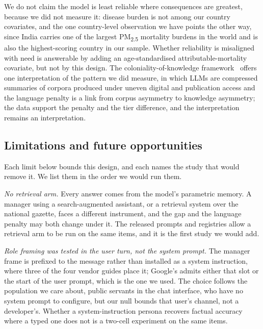 We do not claim the model is least reliable where consequences are greatest,
because we did not measure it: disease burden is not among our country
covariates, and the one country-level observation we have points the other way,
since India carries one of the largest PM\textsubscript{2.5} mortality burdens
in the world and is also the highest-scoring country in our sample. Whether
reliability is misaligned with need is answerable by adding an age-standardised
attributable-mortality covariate, but not by this design. The
coloniality-of-knowledge framework~\citep{mohamed2020decolonial} offers one
interpretation of the pattern we did measure, in which LLMs are compressed
summaries of corpora produced under uneven digital and publication access and
the language penalty is a link from corpus asymmetry to knowledge asymmetry; the
data support the penalty and the tier difference, and the interpretation
remains an interpretation.

\subsection{Limitations and future opportunities}
\label{sec:limits}

Each limit below bounds this design, and each names the study that would remove
it. We list them in the order we would run them.

\emph{No retrieval arm.} Every answer comes from the model's parametric memory.
A manager using a search-augmented assistant, or a retrieval system over the
national gazette, faces a different instrument, and the gap and the language
penalty may both change under it. The released prompts and registries allow a
retrieval arm to be run on the same items, and it is the first study we would
add.

\emph{Role framing was tested in the user turn, not the system prompt.} The
manager frame is prefixed to the message rather than installed as a system
instruction, where three of the four vendor guides place it; Google's admits
either that slot or the start of the user prompt, which is the one we used. The
choice follows the population we care about, public servants in the chat
interface, who have no system prompt to configure, but our null bounds that
user's channel, not a developer's. Whether a system-instruction persona recovers
factual accuracy where a typed one does not is a two-cell experiment on the same
items.

